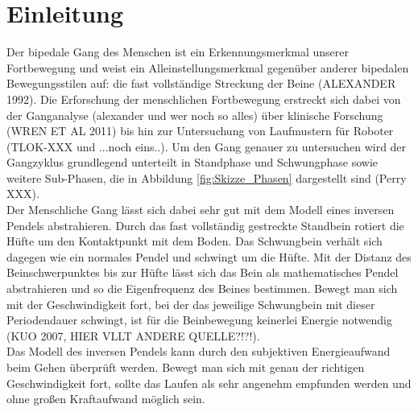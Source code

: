 \section{Einleitung}
Der bipedale Gang des Menschen ist ein Erkennungsmerkmal unserer Fortbewegung und weist ein Alleinstellungsmerkmal gegenüber anderer bipedalen Bewegungsstilen auf: die fast vollständige Streckung der Beine (ALEXANDER 1992). Die Erforschung der menschlichen Fortbewegung erstreckt sich dabei von der Ganganalyse (alexander und wer noch so alles) über klinische Forschung (WREN ET AL 2011) bis hin zur Untersuchung von Laufmustern für Roboter (TLOK-XXX und ...noch eins..).
Um den Gang genauer zu untersuchen wird der Gangzyklus grundlegend unterteilt in Standphase und Schwungphase sowie weitere Sub-Phasen, die in Abbildung \ref{fig:Skizze_Phasen} dargestellt sind (Perry XXX).\\
Der Menschliche Gang lässt sich dabei sehr gut mit dem Modell eines inversen Pendels abstrahieren. Durch das fast vollständig gestreckte Standbein rotiert die Hüfte um den Kontaktpunkt mit dem Boden. Das Schwungbein verhält sich dagegen wie ein normales Pendel und schwingt um die Hüfte. Mit der Distanz des Beinschwerpunktes bis zur Hüfte lässt sich das Bein als mathematisches Pendel abstrahieren und so die Eigenfrequenz des Beines bestimmen. Bewegt man sich mit der Geschwindigkeit fort, bei der das jeweilige Schwungbein mit dieser Periodendauer schwingt, ist für die Beinbewegung keinerlei Energie notwendig (KUO 2007, HIER VLLT ANDERE QUELLE?!?!).\\
Das Modell des inversen Pendels kann durch den subjektiven Energieaufwand beim Gehen überprüft werden. Bewegt man sich mit genau der richtigen Geschwindigkeit fort, sollte das Laufen als sehr angenehm empfunden werden und ohne großen Kraftaufwand möglich sein.
